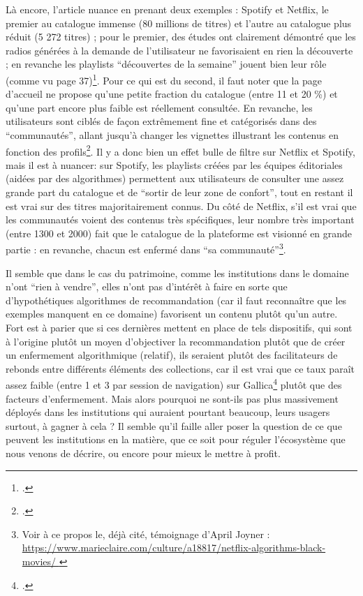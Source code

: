 Là encore, l’article nuance en prenant deux exemples : Spotify et Netflix, le premier au catalogue immense (80 millions de titres) et l’autre au catalogue plus réduit (5 272 titres) ; pour le premier, des études ont clairement démontré que les radios générées à la demande de l’utilisateur ne favorisaient en rien la découverte ; en revanche les playlists \enquote{découvertes de la semaine} jouent bien leur rôle (comme vu page 37)\footcite[§ 2]{durand_chapitre_2016-1}. Pour ce qui est du second, il faut noter que la page d’accueil ne propose qu’une petite fraction du catalogue (entre 11 et 20 \%) et qu’une part encore plus faible est réellement consultée. En revanche, les utilisateurs sont ciblés de façon extrêmement fine et catégorisés dans des \enquote{communautés}, allant jusqu’à changer les vignettes illustrant les contenus en fonction des profils\footcite{noauthor_algorithmes_nodate}. Il y a donc bien un effet bulle de filtre sur Netflix et Spotify, mais il est à nuancer: sur Spotify, les playlists créées par les équipes éditoriales (aidées par des algorithmes) permettent aux utilisateurs de consulter une assez grande part du catalogue et de \enquote{sortir de leur zone de confort}, tout en restant il est vrai sur des titres majoritairement connus. Du côté de Netflix, s’il est vrai que les communautés voient des contenus très spécifiques, leur nombre très important (entre 1300 et 2000) fait que le catalogue de la plateforme est visionné en grande partie : en revanche, chacun est enfermé dans \enquote{sa communauté}\footnote{Voir à ce propos le, déjà cité, témoignage d'April Joyner : \url{https://www.marieclaire.com/culture/a18817/netflix-algorithms-black-movies/ }}.

Il semble que dans le cas du patrimoine, comme les institutions dans le domaine n’ont \enquote{rien à vendre}, elles n’ont pas d’intérêt à faire en sorte que d’hypothétiques algorithmes de recommandation (car il faut reconnaître que les exemples manquent en ce domaine) favorisent un contenu plutôt qu’un autre. Fort est à parier que si ces dernières mettent en place de tels dispositifs, qui sont à l’origine plutôt un moyen d’objectiver la recommandation plutôt que de créer un enfermement algorithmique (relatif), ils seraient plutôt des facilitateurs de rebonds entre différents éléments des collections, car il est vrai que ce taux paraît assez faible (entre 1 et 3 par session de navigation) sur Gallica\footcite{bastard2023} plutôt que des facteurs d’enfermement. Mais alors pourquoi ne sont-ils pas plus massivement déployés dans les institutions qui auraient pourtant beaucoup, leurs usagers surtout, à gagner à cela ? Il semble qu’il faille aller poser la question de ce que peuvent les institutions en la matière, que ce soit pour réguler l’écosystème que nous venons de décrire, ou encore pour mieux le mettre à profit.

